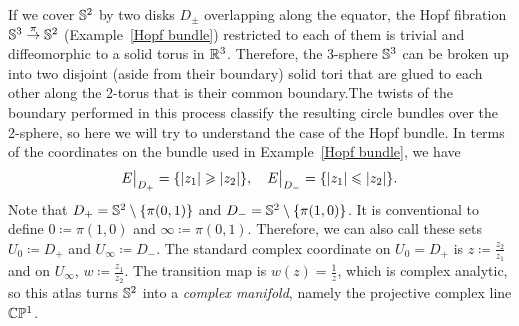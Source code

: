 \begin{example}\label{ex hopf bundle atlas}
    If we cover $\mathbb{S}^2$ by two disks $D_\pm$ overlapping along the equator, the Hopf fibration $\mathbb{S}^3\overset\pi\to \mathbb{S}^2$ (Example~\ref{Hopf bundle}) restricted to each of them is trivial and diffeomorphic to a solid torus in $\mathbb{R}^3$. Therefore, the 3-sphere $\mathbb{S}^3$ can be broken up into two disjoint (aside from their boundary) solid tori that are glued to each other along the 2-torus that is their common boundary.The twists of the boundary performed in this process classify the resulting circle bundles over the 2-sphere, so here we will try to understand the case of the Hopf bundle. In terms of the coordinates on the bundle used in Example~\ref{Hopf bundle}, we have 
    \[\restr{E}{D_+}=\{|z_1|\geq|z_2|\},\quad \restr{E}{D_-}=\{|z_1|\leq|z_2|\}.\]
    Note that $D_+=\mathbb{S}^2\setminus \{\pi(0,1)\}$ and $D_-=\mathbb{S}^2 \setminus \{\pi(1,0)\}$. It is conventional to define $0\coloneqq \pi(1,0)$ and $\infty\coloneqq \pi(0,1)$. Therefore, we can also call these sets $U_0\coloneqq D_+$ and $U_\infty\coloneqq D_-$. The standard complex coordinate on $U_0=D_+$ is $z\coloneqq \frac{z_2}{z_1}$ and on $U_\infty$, $w\coloneqq \frac{z_1}{z_2}$. The transition map is $w(z)=\frac{1}{z}$, which is complex analytic, so this atlas turns $\mathbb{S}^2$ into a \emph{complex manifold}, namely the projective complex line $\mathbb{C}\mathbb{P}^1$.
    

\end{example}
